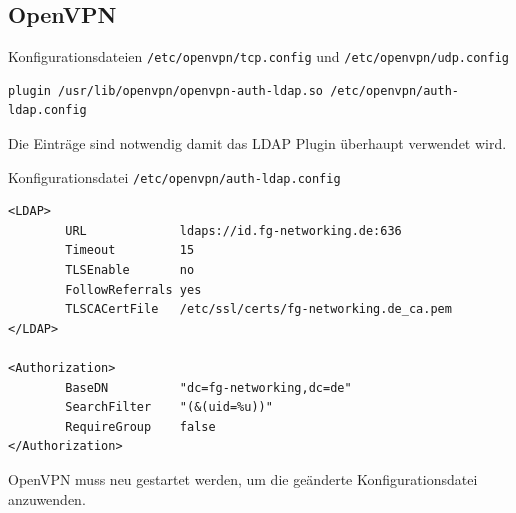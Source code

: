 \documentclass[11pt,a4paper,titlepage=firstiscover,headsepline,bibtotoc]{scrartcl} %
\begin{document}
\subsection{OpenVPN}
Konfigurationsdateien \texttt{/etc/openvpn/tcp.config} und \texttt{/etc/openvpn/udp.config}
\begin{lstlisting}
plugin /usr/lib/openvpn/openvpn-auth-ldap.so /etc/openvpn/auth-ldap.config
\end{lstlisting}
Die Einträge sind notwendig damit das LDAP Plugin überhaupt verwendet wird.

Konfigurationsdatei \texttt{/etc/openvpn/auth-ldap.config}
\begin{lstlisting}
<LDAP>
        URL             ldaps://id.fg-networking.de:636
        Timeout         15
        TLSEnable       no
        FollowReferrals yes
        TLSCACertFile   /etc/ssl/certs/fg-networking.de_ca.pem
</LDAP>

<Authorization>
        BaseDN          "dc=fg-networking,dc=de"
        SearchFilter    "(&(uid=%u))"
        RequireGroup    false
</Authorization>
\end{lstlisting}
OpenVPN muss neu gestartet werden, um die geänderte Konfigurationsdatei anzuwenden.
\end{document}
